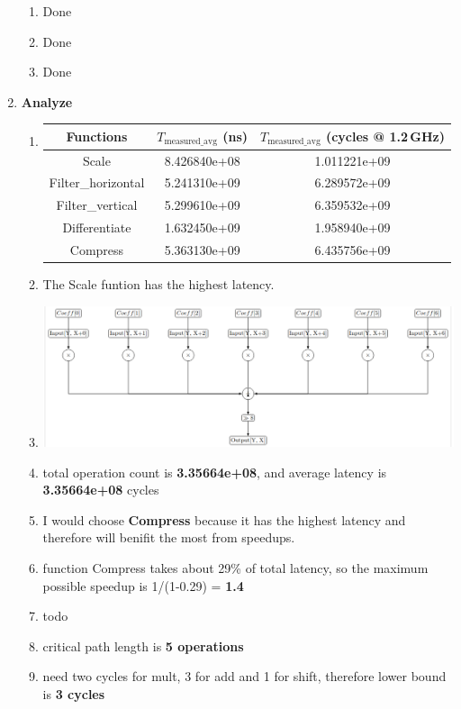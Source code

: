 \documentclass[12pt]{article}
\begin{document}
\begin{enumerate}
\begin{tabular}{|c|c|c|c|}
        \end{tabular}
        \begin{enumerate}[label=\arabic*)]
        \item Done
        \item Done
        \item Done

    \end{enumerate}

    \item \textbf{Analyze}
    \begin{enumerate}[label=\arabic*)]
        \item \begin{tabular}{|c|c|c|}
\hline
Functions & $T_{\text{measured\_avg}}$ (ns) & $T_{\text{measured\_avg}}$ (cycles @ 1.2\,GHz) \\
\hline
Scale             & 8.426840e+08 & 1.011221e+09 \\
\hline
Filter\_horizontal & 5.241310e+09 & 6.289572e+09 \\
\hline
Filter\_vertical   & 5.299610e+09 & 6.359532e+09 \\
\hline
Differentiate      & 1.632450e+09 & 1.958940e+09 \\
\hline
Compress           & 5.363130e+09 & 6.435756e+09 \\
\hline
\end{tabular}
    \item The Scale funtion has the highest latency.
    \item \includegraphics[width=1.0\textwidth]{3_3.png}
    \item total operation count is \textbf{3.35664e+08}, and average latency is \textbf{3.35664e+08} cycles
    \item I would choose \textbf{Compress} because it has the highest latency and therefore will benifit the most from speedups.
    \item function Compress takes about 29\% of total latency, so the maximum possible speedup is 1/(1-0.29) = \textbf{1.4}
    \item todo
    \item critical path length is \textbf{5 operations}
    \item need two cycles for mult, 3 for add and 1 for shift, therefore lower bound is \textbf{3 cycles}

    \end{enumerate}

\end{enumerate}
\end{document}
